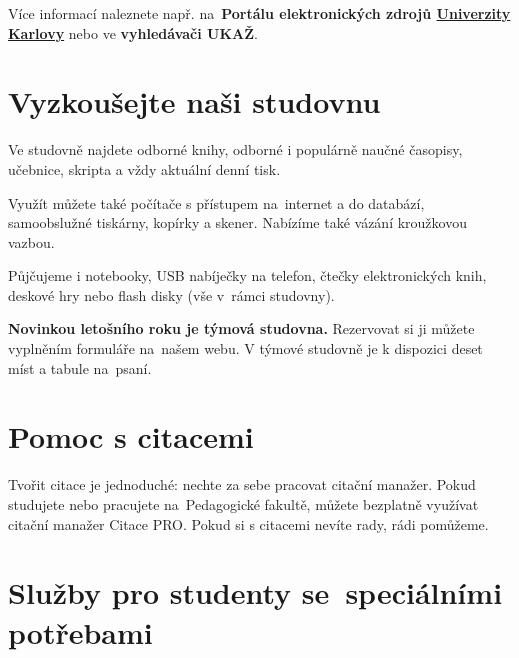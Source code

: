 Více informací naleznete např. na~\textbf{Portálu elektronických zdrojů
  {\href{https://ezdroje.cuni.cz}{Univerzity Karlovy}}} nebo ve \textbf{vyhledávači UKAŽ}.




\ikonka{\faGraduationCap}
\section{Vyzkoušejte naši studovnu}

Ve studovně najdete odborné knihy, odborné i populárně naučné
časopisy, učebnice, skripta a vždy aktuální denní tisk.

Využít můžete také počítače s přístupem na~internet a do databází,
samoobslužné tiskárny, kopírky a skener. Nabízíme také vázání kroužkovou vazbou.

Půjčujeme i notebooky, USB nabíječky na
telefon, čtečky elektronických knih, deskové hry nebo flash disky (vše
v~rámci studovny).

\textbf{Novinkou letošního roku je týmová studovna.} Rezervovat si ji můžete
vyplněním formuláře na~našem webu. V týmové studovně je k dispozici deset míst
a tabule na~psaní.




\ikonka{\faAndroid}
\section{Pomoc s citacemi}

Tvořit citace je jednoduché: nechte za sebe pracovat citační manažer.
Pokud studujete nebo pracujete na~Pedagogické fakultě,
můžete bezplatně využívat citační manažer Citace PRO.
Pokud si s citacemi nevíte rady, rádi pomůžeme.

\bigskip
\ikonka{\faHeart}
\section{Služby pro studenty se~speciálními potřebami}


